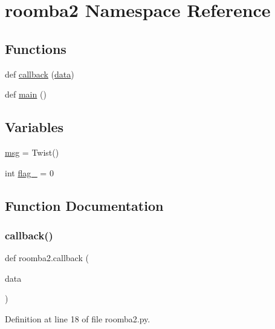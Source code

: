 \hypertarget{namespaceroomba2}{}\section{roomba2 Namespace Reference}
\label{namespaceroomba2}
\subsection*{Functions}
\begin{DoxyCompactItemize}
\item 
def \mbox{\hyperlink{namespaceroomba2_a376f5a2234db5be88aecafa6073bd1e9}{callback}} (\mbox{\hyperlink{structdata}{data}})
\item 
def \mbox{\hyperlink{namespaceroomba2_ab5c01b828d7154513b4e885751de4638}{main}} ()
\end{DoxyCompactItemize}
\subsection*{Variables}
\begin{DoxyCompactItemize}
\item 
\mbox{\hyperlink{namespaceroomba2_aaa28f0f5afb8a4fa21eadb03177aa441}{msg}} = Twist()
\item 
int \mbox{\hyperlink{namespaceroomba2_a4876a4d06865fd61e97455e6d06d54d6}{flag\+\_}} = 0
\end{DoxyCompactItemize}


\subsection{Function Documentation}
\mbox{\label{namespaceroomba2_a376f5a2234db5be88aecafa6073bd1e9}} 
\subsubsection{\texorpdfstring{callback()}{callback()}}
{\footnotesize\ttfamily def roomba2.\+callback (\begin{DoxyParamCaption}\item[{}]{data }\end{DoxyParamCaption})}



Definition at line 18 of file roomba2.\+py.

\mbox{\label{namespaceroomba2_ab5c01b828d7154513b4e885751de4638}} 
